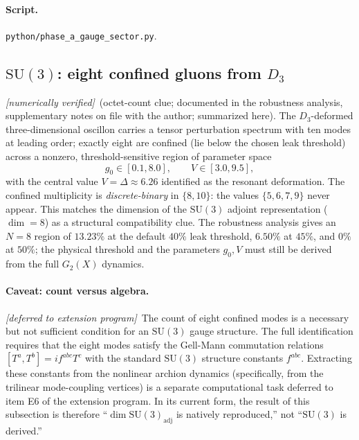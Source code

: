 \documentclass[11pt]{article}
\newcommand{\numerical}{\textit{[numerically verified]}}
\newcommand{\deferred}{\textit{[deferred to extension program]}}
\begin{document}
\paragraph{Script.} \texttt{python/phase\_a\_gauge\_sector.py}.

\subsection{$\mathrm{SU}(3)$: eight confined gluons from $D_3$}
\label{sec:phaseA_su3}

\numerical\ (octet-count clue; documented in the robustness
analysis, supplementary notes on file with the author; summarized
here).
The $D_3$-deformed three-dimensional oscillon carries a tensor
perturbation spectrum with ten modes at leading order; exactly
eight are confined (lie below the chosen leak threshold) across a
nonzero, threshold-sensitive region of parameter space
\begin{equation}
  g_0 \in [0.1, 8.0], \qquad V \in [3.0, 9.5],
\end{equation}
with the central value $V=\Delta\approx 6.26$ identified as the
resonant deformation. The confined multiplicity is
\emph{discrete-binary} in $\{8,10\}$: the values $\{5,6,7,9\}$
never appear. This matches the dimension of the
$\mathrm{SU}(3)$ adjoint representation ($\dim=8$) as a structural
compatibility clue. The robustness analysis gives an $N=8$ region
of $13.23\%$ at the default $40\%$ leak threshold, $6.50\%$ at
$45\%$, and $0\%$ at $50\%$; the physical threshold and the
parameters $g_0,V$ must still be derived from the full
$G_2(X)$ dynamics.

\paragraph{Caveat: count versus algebra.}
\deferred\ The count of eight confined modes is a necessary but
not sufficient condition for an $\mathrm{SU}(3)$ gauge
structure. The full identification requires that the eight
modes satisfy the Gell-Mann commutation relations
$[T^a,T^b]=if^{abc}T^c$ with the standard $\mathrm{SU}(3)$
structure constants $f^{abc}$. Extracting these constants from
the nonlinear archion dynamics (specifically, from the
trilinear mode-coupling vertices) is a separate computational
task deferred to item E6 of the extension program. In its
current form, the result of this subsection is therefore
``$\dim\mathrm{SU}(3)_{\mathrm{adj}}$ is natively reproduced,''
not ``$\mathrm{SU}(3)$ is derived.''
\end{document}
